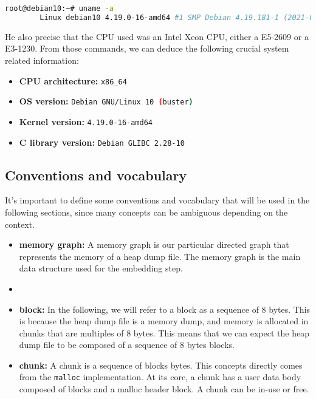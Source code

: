     \begin{minipage}{\dimexpr\linewidth-20pt}
    \begin{lstlisting}[language=bash, caption={Command and logs of the OS and kernel version used for the dataset generation}]
        root@debian10:~# uname -a
        Linux debian10 4.19.0-16-amd64 #1 SMP Debian 4.19.181-1 (2021-03-19) x86_64 GNU/Linux
    \end{lstlisting}
    \end{minipage}

    He also precise that the CPU used was an Intel Xeon CPU, either a E5-2609 or a E3-1230. From those commands, we can deduce the following crucial system related information:

    \begin{itemize}
        \item \textbf{CPU architecture:} \lstinline[language=bash]|x86_64|
        \item \textbf{OS version:} \lstinline[language=bash]|Debian GNU/Linux 10 (buster)|
        \item \textbf{Kernel version:} \lstinline[language=bash]|4.19.0-16-amd64|
        \item \textbf{C library version:} \lstinline[language=bash]|Debian GLIBC 2.28-10|
    \end{itemize}

    \subsection{Conventions and vocabulary}
    It's important to define some conventions and vocabulary that will be used in the following sections, since many concepts can be ambiguous depending on the context.

    \begin{itemize}
        \item \textbf{memory graph:} A memory graph is our particular directed graph that represents the memory of a heap dump file. The memory graph is the main data structure used for the embedding step.
        \item \item \textbf{block:} In the following, we will refer to a block as a sequence of 8 bytes. This is because the heap dump file is a memory dump, and memory is allocated in chunks that are multiples of 8 bytes. This means that we can expect the heap dump file to be composed of a sequence of 8 bytes blocks.
        \item \textbf{chunk:} A chunk is a sequence of blocks bytes. This concepts directly comes from the \lstinline[language=c]|malloc| implementation. At its core, a chunk has a user data body composed of blocks and a malloc header block. A chunk can be in-use or free.
    \end{itemize}

